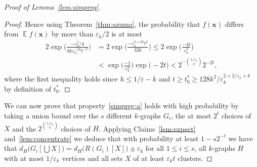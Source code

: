\documentclass[12pt,a4paper]{amsart}
\let\eps\varepsilon
\newcommand{\oldqed}{}
\def\endofClaim{\hfill\scalebox{.6}{$\Box$}}
\newenvironment{claimproof}[1][Proof]{
  \renewcommand{\oldqed}{\qedsymbol}
  \renewcommand{\qedsymbol}{\endofClaim}
  \begin{proof}[#1]
}{
  \end{proof}
  \renewcommand{\qedsymbol}{\oldqed}
}
\newcommand{\Exp}{\mathop{\mathbb{E}}}
\begin{document}
\begin{proof}[Proof of Lemma~\ref{lem:simpreg}]
\begin{claimproof}
  Hence using Theorem~\ref{thm:azuma}, the probability that
  $f(\mathbf{x})$ differs from $\Exp f(\mathbf{x})$ by more than $\eps_k/2$
  is at most
\begin{align*}
  2\exp\Big(\frac{-\eps_k^2/4}{8k\eps_k^{-2h}t^{-2}}\Big) &= 
  2\exp\Big(\frac{-\eps_k^{2+2h}t^2}{32k}\Big) \leq
  2\exp\Big(\frac{-4t}{\eps_k^k} \Big) \\
  & < \exp\Big( \frac{-1}{\eps_k^k} \Big)\exp \Big(-2t\Big) <
  2^{-\binom{1/\eps_k}{k}}2^{ -2t},
\end{align*}
  where the first inequality holds since $h\le 1/\eps-k$ and $t \geq t_0^* \geq 128k^2/\eps_k^{2+2/\eps_k+k}$ by definition of $t_0^*$.
\end{claimproof}


We can now prove that property~\ref{simpreg:a} holds with high probability by taking a union bound over the $s$ different $k$-graphs $G_i$, the at most
  $2^{t}$ choices of $X$ and the $2^{\binom{1/\eps_k}{k}}$ choices of $H$.
  Applying Claims~\ref{lem:expect} and~\ref{lem:concentrate} we deduce that with
  probability at least $1 - s2^{-t}$ we
  have that $d_H\big(G_i[\bigcup X]\big)=d_H\big(R(G_i)[X]\big) \pm \eps_k$ for
  all $1 \leq i \leq s$, all $k$-graphs $H$ with at most $1/\eps_k$ vertices and all sets $X$ of at least $\eps_k t$ clusters.

\smallskip


\end{proof}
\end{document}
